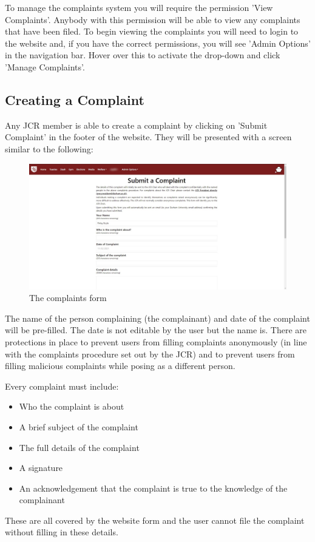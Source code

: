 \documentclass{article}
\begin{document}
To manage the complaints system you will require the permission 'View Complaints'. Anybody with this permission will be able to view any complaints that have been filed. To begin viewing the complaints you will need to login to the website and, if you have the correct permissions, you will see 'Admin Options' in the navigation bar. Hover over this to activate the drop-down and click 'Manage Complaints'.
\subsection{Creating a Complaint}
Any JCR member is able to create a complaint by clicking on 'Submit Complaint' in the footer of the website. They will be presented with a screen similar to the following:
\begin{figure}[H]
    \centering
    \includegraphics[width=\textwidth,height=\textheight,keepaspectratio]{complaints/complaints_form.png}
    \caption{The complaints form}
    \label{fig:complaints_form}
\end{figure}
The name of the person complaining (the complainant) and date of the complaint will be pre-filled. The date is not editable by the user but the name is. There are protections in place to prevent users from filling complaints anonymously (in line with the complaints procedure set out by the JCR) and to prevent users from filling malicious complaints while posing as a different person.

Every complaint must include:
\begin{itemize}
    \item Who the complaint is about
    \item A brief subject of the complaint
    \item The full details of the complaint
    \item A signature
    \item An acknowledgement that the complaint is true to the knowledge of the complainant
\end{itemize}
These are all covered by the website form and the user cannot file the complaint without filling in these details. 
\end{document}
